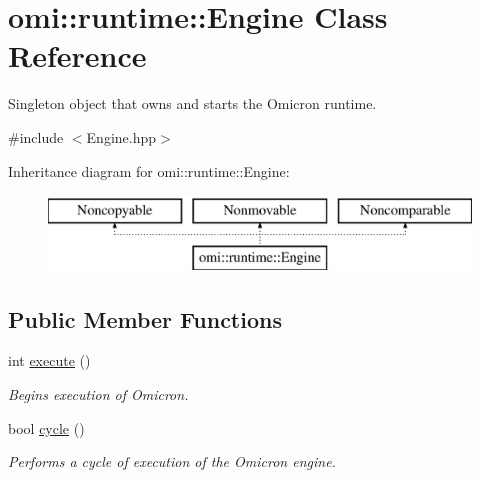 \hypertarget{classomi_1_1runtime_1_1_engine}{}\section{omi\+:\+:runtime\+:\+:Engine Class Reference}
\label{classomi_1_1runtime_1_1_engine}


Singleton object that owns and starts the Omicron runtime.  




{\ttfamily \#include $<$Engine.\+hpp$>$}

Inheritance diagram for omi\+:\+:runtime\+:\+:Engine\+:\begin{figure}[H]
\begin{center}
\leavevmode
\includegraphics[height=2.000000cm]{classomi_1_1runtime_1_1_engine}
\end{center}
\end{figure}
\subsection*{Public Member Functions}
\begin{DoxyCompactItemize}
\item 
int \hyperlink{classomi_1_1runtime_1_1_engine_add2aeb2865862a1dc5e8b5592cad2e5e}{execute} ()
\begin{DoxyCompactList}\small\item\em Begins execution of Omicron. \end{DoxyCompactList}\item 
bool \hyperlink{classomi_1_1runtime_1_1_engine_ab717cc2830aac8d4816b7d158d1ae9ca}{cycle} ()
\begin{DoxyCompactList}\small\item\em Performs a cycle of execution of the Omicron engine. \end{DoxyCompactList}\end{DoxyCompactItemize}
